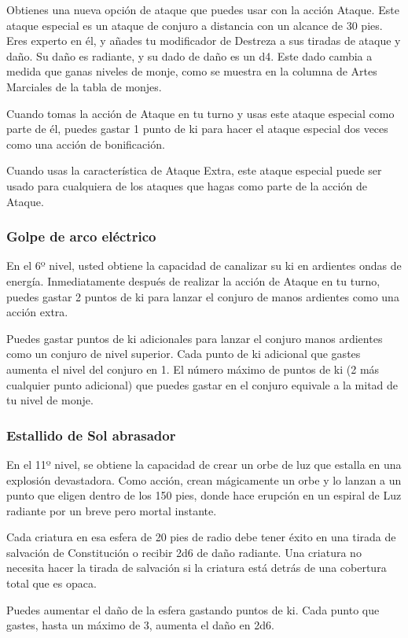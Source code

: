 \documentclass[a4paper,twocolumn,openany,10pt]{dndbook}
\begin{document}
Obtienes una nueva opción de ataque que puedes usar con la acción Ataque. Este ataque especial es un ataque de conjuro a
distancia con un alcance de 30 pies. Eres experto en él, y añades tu modificador de Destreza a sus tiradas de ataque y daño. Su
daño es radiante, y su dado de daño es un d4. Este dado cambia a medida que ganas niveles de monje, como se muestra en la
columna de Artes Marciales de la tabla de monjes.

Cuando tomas la acción de Ataque en tu turno y usas este ataque especial como parte de él, puedes gastar 1 punto de ki para
hacer el ataque especial dos veces como una acción de bonificación. 

Cuando usas la característica de Ataque Extra, este ataque especial puede ser usado para cualquiera de los ataques que hagas
como parte de la acción de Ataque.

\subsubsection{Golpe de arco eléctrico}
En el 6º nivel, usted obtiene la capacidad de canalizar su ki en ardientes ondas de energía. Inmediatamente después de realizar
la acción de Ataque en tu turno, puedes gastar 2 puntos de ki para lanzar el conjuro de manos ardientes como una acción extra.

Puedes gastar puntos de ki adicionales para lanzar el conjuro manos ardientes como un conjuro de nivel superior. Cada punto de
ki adicional que gastes aumenta el nivel del conjuro en 1. El número máximo de puntos de ki (2 más cualquier punto adicional)
que puedes gastar en el conjuro equivale a la mitad de tu nivel de monje.

\subsubsection{Estallido de Sol abrasador}
En el 11º nivel, se obtiene la capacidad de crear un orbe de luz que estalla en una explosión devastadora. Como acción, crean
mágicamente un orbe y lo lanzan a un punto que eligen dentro de los 150 pies, donde hace erupción en un espiral de Luz radiante
por un breve pero mortal instante.

Cada criatura en esa esfera de 20 pies de radio debe tener éxito en una tirada de salvación de Constitución o recibir 2d6 de
daño radiante. Una criatura no necesita hacer la tirada de salvación si la criatura está detrás de una cobertura total que es
opaca.

Puedes aumentar el daño de la esfera gastando puntos de ki. Cada punto que gastes, hasta un máximo de 3, aumenta el daño en 2d6.
\end{document}
